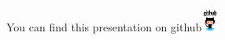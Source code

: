\documentclass[newPxFont]{beamer}
\begin{document}
{
%
\begin{frame}
  \vspace{-1em}
  \begin{minipage}[t][.8\textheight]{\textwidth}

    \vfill

  \end{minipage}
  \vspace{-3.5em}
  \centering
	You can find this presentation on github\includegraphics[height=0.85cm]{img/github}

\end{frame}
}
\end{document}
